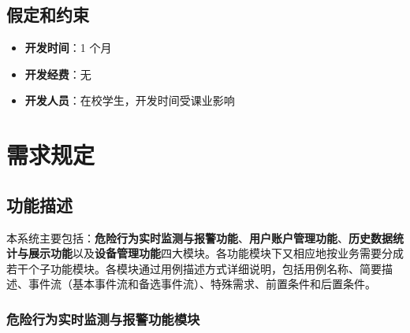 \documentclass[a4paper,12pt]{article}
\begin{document}
\subsection{假定和约束}
\begin{itemize}
    \item \textbf{开发时间}：1 个月
    \item \textbf{开发经费}：无
    \item \textbf{开发人员}：在校学生，开发时间受课业影响
\end{itemize}

\section{需求规定}

\subsection{功能描述}
本系统主要包括：\textbf{危险行为实时监测与报警功能}、\textbf{用户账户管理功能}、\textbf{历史数据统计与展示功能}以及\textbf{设备管理功能}四大模块。各功能模块下又相应地按业务需要分成若干个子功能模块。各模块通过用例描述方式详细说明，包括用例名称、简要描述、事件流（基本事件流和备选事件流）、特殊需求、前置条件和后置条件。

\subsubsection{危险行为实时监测与报警功能模块}
\end{document}
